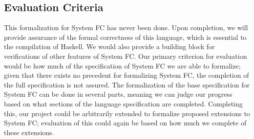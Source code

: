 \documentclass{sig-alternate}
\begin{document}
\subsection{Evaluation Criteria}
\label{subsec:eval_criteria}
This formalization for System FC has never been done.  Upon completion, we will provide assurance of the formal correctness of this language, which is essential to the compilation of Haskell. We would also provide a building block for verifications of other features of System FC.
Our primary criterion for evaluation would be how much of the specification of System FC we are able to formalize; given that there exists no precedent for formalizing System FC, the completion of the full specification is not assured. The formalization of the base specification for System FC can be done in several parts, meaning we can judge our progress based on what sections of the language specification are completed. Completing this, our project could be arbitrarily extended to formalize proposed extensions to System FC; evaluation of this could again be based on how much we complete of these extensions.
\end{document}
